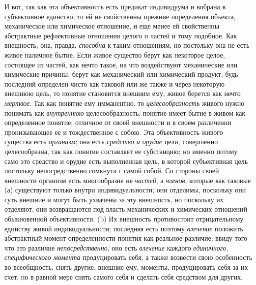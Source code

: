 {{И вот, так как эта объективность есть предикат индивидуума и
вобрана в субъективное единство, то ей не свойственны прежние определения
объекта, механическое или химическое отношение, и еще менее ей свойственны
абстрактные рефлективные отношения целого и частей и тому подобное. Как
внешность, она, правда, {\em способна}
к таким отношениям, но постольку она не есть живое наличное
бытие. Если живое существо берут как некоторое целое, состоящее из частей,
как нечто такое, на что воздействуют механические или химические причины,
берут как механический или химический продукт, будь последний определен
чисто как таковой или же также и через некоторую внешнюю
цель, то понятие становится внешним ему, живое берется как нечто
{\em мертвое}. Так как
понятие ему имманентно, то
{\em целесообразность}
живого нужно понимать как
{\em внутреннюю}
целесообразность; понятие имеет бытие в живом как
определенное понятие; отличное от своей внешности и в своем различении
пронизывающее ее и тождественное с собою. Эта объективность живого существа
есть {\em организм}; она
есть {\em средство и орудие}
цели, совершенно целесообразна, так как понятие составляет ее
субстанцию; но именно потому само это средство и орудие есть выполненная
цель, в которой субъективная цель постольку непосредственно сомкнута с
самой собой. Со стороны своей внешности организм есть многообразие не
{\em частей}, а
{\em членов}, которые как
таковые (а) существуют только внутри индивидуальности; они отделимы,
поскольку они суть внешние и могут быть ухвачены за эту внешность, но
поскольку их отделяют, они возвращаются под власть механических и
химических отношений обыкновенной объективности. (b) Их внешность
противостоит отрицательному единству живой индивидуальности; последняя есть
поэтому {\em влечение}
положить абстрактный момент определенности понятия как
реальное различие; ввиду того что это различие
{\em непосредственно},
оно есть {\em влечение}
каждого {\em единичного},
{\em специфического момента}
продуцировать себя, а также возвести свою особенность во
всеобщность, снять другие, внешние ему, моменты, продуцировать себя за их
счет, но в равной мере снять самого себя и сделать себя средством для
других.

}}
